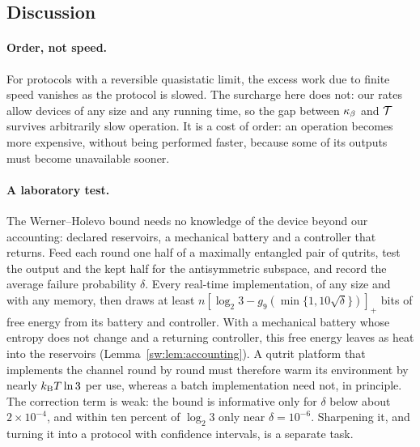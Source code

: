 \subsection{Discussion}\label{sw:sec:discussion}

\paragraph{Order, not speed.} For protocols with a reversible quasistatic limit, the excess work due to finite speed vanishes as the protocol is slowed. The surcharge here does not: our rates allow devices of any size and any running time, so the gap between $\kappa_\beta$ and $\mathcal T$ survives arbitrarily slow operation. It is a cost of order: an operation becomes more expensive, without being performed faster, because some of its outputs must become unavailable sooner.

\paragraph{A laboratory test.} The Werner--Holevo bound needs no knowledge of the device beyond our accounting: declared reservoirs, a mechanical battery and a controller that returns. Feed each round one half of a maximally entangled pair of qutrits, test the output and the kept half for the antisymmetric subspace, and record the average failure probability $\delta$. Every real-time implementation, of any size and with any memory, then draws at least $n[\log_2 3-g_9(\min\{1,10\sqrt\delta\})]_+$ bits of free energy from its battery and controller. With a mechanical battery whose entropy does not change and a returning controller, this free energy leaves as heat into the reservoirs (Lemma~\ref{sw:lem:accounting}). A qutrit platform that implements the channel round by round must therefore warm its environment by nearly $k_{\mathrm B} T\ln 3$ per use, whereas a batch implementation need not, in principle. The correction term is weak: the bound is informative only for $\delta$ below about $2\times10^{-4}$, and within ten percent of $\log_2 3$ only near $\delta=10^{-6}$. Sharpening it, and turning it into a protocol with confidence intervals, is a separate task.

